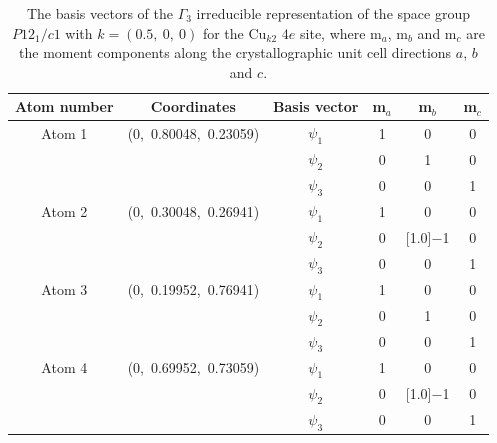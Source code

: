 \documentclass[
sn-mathphys,
Numbered,
onecolumn]
{sn-jnl}%
\newcommand{\minus}{\scalebox{0.75}[1.0]{$-$}}
\begin{document}
\begin{table}[ht!]
    \centering
    \begin{tabular}{c c c c c c} \hline \hline
      Atom number & Coordinates & {Basis vector} & {m$_a$} & m$_b$ &{m$_c$} \\ \hline
       Atom 1 & (0,~0.80048,~0.23059) & $\psi_1$ & 1 & 0 & 0 \\ 
      & & $\psi_2$ & 0 & 1 &  0  \\
     & & $\psi_3$ & 0 & 0 & 1  \\
     Atom 2 & (0,~0.30048,~0.26941) & $\psi_1$ &  1 & 0 & 0 \\
    & & $\psi_2$ & 0 &  \minus 1 &  0  \\
     & & $\psi_3$ & 0 & 0 &  1  \\ 
     Atom 3 & (0,~0.19952,~0.76941) & $\psi_1$ &  1 & 0 & 0 \\
    & & $\psi_2$ & 0 &  1 &  0  \\
     & & $\psi_3$ & 0 & 0 &  1  \\ 
     Atom 4 & (0,~0.69952,~0.73059) & $\psi_1$ &  1 & 0 & 0 \\
    & & $\psi_2$ & 0 & \minus 1 &  0  \\
     & & $\psi_3$ & 0 & 0 &  1 \\ 
       \hline \hline
   
\end{tabular}
    \caption{The basis vectors of the $\Gamma_3$ irreducible representation of the space group $P12_1/c1$ with ${k}=(0.5,~0,~0)$ for the Cu$_{k2}$ $4e$ site, where m$_a$, m$_b$ and m$_c$ are the moment components along the crystallographic unit cell directions $a$, $b$ and $c$.}
    \label{avv_cuk2_BVs_gamma3}
\end{table}
\end{document}
